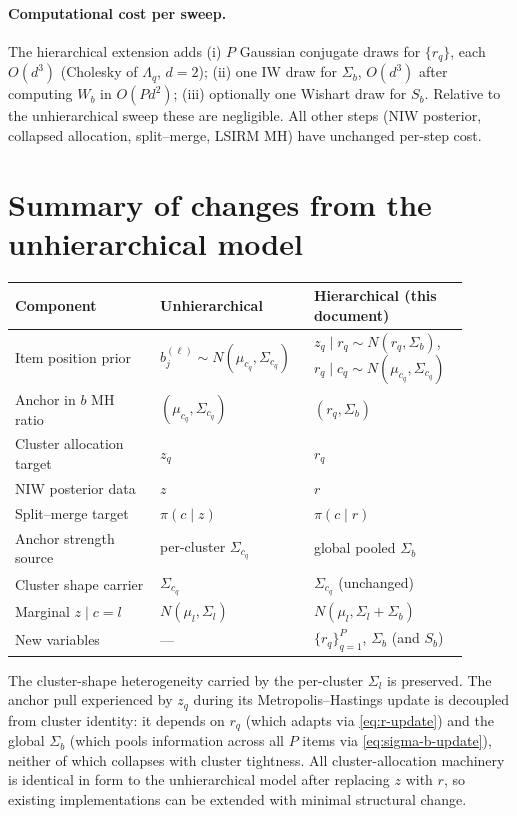 \documentclass[11pt]{article}
\begin{document}
\paragraph{Computational cost per sweep.}
The hierarchical extension adds (i) $P$ Gaussian conjugate draws for $\{r_q\}$, each $O(d^3)$ (Cholesky of $\Lambda_q$, $d=2$); (ii) one IW draw for $\Sigma_b$, $O(d^3)$ after computing $W_b$ in $O(Pd^2)$; (iii) optionally one Wishart draw for $S_b$.  Relative to the unhierarchical sweep these are negligible.  All other steps (NIW posterior, collapsed allocation, split--merge, LSIRM MH) have unchanged per-step cost.

\section{Summary of changes from the unhierarchical model}

\begin{center}
\begin{tabular}{p{0.30\linewidth}p{0.30\linewidth}p{0.30\linewidth}}
\toprule
Component & Unhierarchical & Hierarchical (this document) \\
\midrule
Item position prior & $b_j^{(\ell)}\sim N(\mu_{c_q},\Sigma_{c_q})$ & $z_q\mid r_q\sim N(r_q,\Sigma_b)$, $r_q\mid c_q\sim N(\mu_{c_q},\Sigma_{c_q})$ \\
Anchor in $b$ MH ratio & $(\mu_{c_q},\Sigma_{c_q})$ & $(r_q,\Sigma_b)$ \\
Cluster allocation target & $z_q$ & $r_q$ \\
NIW posterior data & $z$ & $r$ \\
Split--merge target & $\pi(c\mid z)$ & $\pi(c\mid r)$ \\
Anchor strength source & per-cluster $\Sigma_{c_q}$ & global pooled $\Sigma_b$ \\
Cluster shape carrier & $\Sigma_{c_q}$ & $\Sigma_{c_q}$ (unchanged) \\
Marginal $z\mid c=l$ & $N(\mu_l,\Sigma_l)$ & $N(\mu_l,\Sigma_l+\Sigma_b)$ \\
New variables & --- & $\{r_q\}_{q=1}^P$, $\Sigma_b$ (and $S_b$) \\
\bottomrule
\end{tabular}
\end{center}

The cluster-shape heterogeneity carried by the per-cluster $\Sigma_l$ is preserved.  The anchor pull experienced by $z_q$ during its Metropolis--Hastings update is decoupled from cluster identity: it depends on $r_q$ (which adapts via \eqref{eq:r-update}) and the global $\Sigma_b$ (which pools information across all $P$ items via \eqref{eq:sigma-b-update}), neither of which collapses with cluster tightness.  All cluster-allocation machinery is identical in form to the unhierarchical model after replacing $z$ with $r$, so existing implementations can be extended with minimal structural change.
\end{document}
